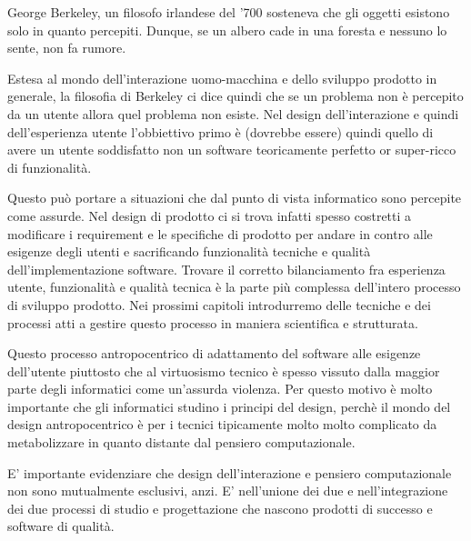 George Berkeley, un filosofo irlandese del '700 sosteneva che gli oggetti esistono solo in quanto percepiti. Dunque, se un albero cade in una foresta e nessuno lo sente, non fa rumore.

Estesa al mondo dell'interazione uomo-macchina e dello sviluppo prodotto in generale, la filosofia di Berkeley ci dice quindi che se un problema non è percepito da un utente allora quel problema non esiste. Nel design dell'interazione e quindi dell'esperienza utente l'obbiettivo primo è (dovrebbe essere) quindi quello di avere un utente soddisfatto non un software teoricamente perfetto or super-ricco di funzionalità.

 
Questo può portare a situazioni che dal punto di vista informatico sono percepite come assurde. Nel design di prodotto ci si trova infatti spesso costretti a modificare i requirement e le specifiche di prodotto per andare in contro alle esigenze degli utenti e sacrificando funzionalità tecniche e qualità dell'implementazione software.
 Trovare il corretto bilanciamento fra esperienza utente, funzionalità e qualità tecnica è la parte più complessa dell'intero processo di sviluppo prodotto. Nei prossimi capitoli introdurremo delle tecniche e dei processi atti a gestire questo processo in maniera scientifica e strutturata.
 
 
Questo processo antropocentrico di adattamento del software alle esigenze dell'utente piuttosto che al virtuosismo tecnico è spesso vissuto dalla maggior parte degli informatici come un'assurda violenza. Per questo motivo è molto importante che gli informatici studino i principi del design, perchè il mondo del design antropocentrico è per i tecnici tipicamente molto molto complicato da metabolizzare in quanto distante dal pensiero computazionale.

E' importante evidenziare che design dell'interazione e pensiero computazionale non sono mutualmente esclusivi, anzi. E' nell'unione dei due e nell'integrazione dei due processi di studio e progettazione che nascono prodotti di successo e software di qualità. \\

